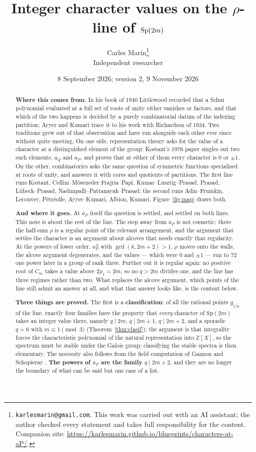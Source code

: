 \documentclass[11pt,a4paper]{article}
\title{\vspace{-1.4cm}\Large Integer character values on the $\rho$-line of $\Sp(2m)$}
\author{\normalsize Carles Mar\'in\thanks{\texttt{karlesmarin@gmail.com}.
This work was carried out with an AI assistant; the author checked every statement and takes full responsibility for the content. Companion site: \url{https://karlesmarin.github.io/blueprints/characters-at-aP/}.}\\[2pt]\small Independent researcher}
\date{\normalsize 8 September 2026; version 2, 9 November 2026}
\theoremstyle{definition}
\newcommand{\Sp}{\mathrm{Sp}}
\newcommand{\ZZ}{\mathbb{Z}}
\begin{document}
\maketitle
\thispagestyle{empty}

\begin{abstract}
\noindent \textbf{Where this comes from.} In his book of 1940 Littlewood recorded that a Schur polynomial
evaluated at a full set of roots of unity either vanishes or factors, and that which of the two
happens is decided by a purely combinatorial datum of the indexing partition; Ayyer and Kumari
\cite[\S1]{AK25} trace it to his work with Richardson of 1934. Two traditions grew
out of that observation and have run alongside each other ever since without quite meeting. On one
side, representation theory asks for the value of a character at a distinguished element of the
group: Kostant's 1976 paper singles out two such elements, $a_Q$ and $a_P$, and proves that at
either of them every character is $0$ or $\pm1$. On the other, combinatorics asks the same question
of symmetric functions specialised at roots of unity, and answers it with cores and quotients of
partitions. The first line runs Kostant, Cellini--M\"oseneder Frajria--Papi,
Kumar--Lusztig--Prasad, Prasad, L\"ubeck--Prasad, Nadimpalli--Pattanayak--Prasad; the second runs
Adin--Frumkin, Lecouvey, P\'etr\'eolle, Ayyer--Kumari, Albion, Kumari. Figure~\ref{fig:map} draws
both.

\smallskip
\noindent \textbf{And where it goes.} At $a_P$ itself the question is settled, and settled on
both lines. This note is about the rest of the line. The step away from $a_P$ is not cosmetic:
there the half-sum $\rho$ is a regular point of the relevant arrangement, and the argument that
settles the character is an argument about alcoves that needs exactly that regularity. At the
powers of lower order, $a_P^{\,k}$ with $\gcd(k,2m+2)>1$, $\rho$ moves onto the walls, the alcove argument degenerates, and the values --- which
were $0$ and $\pm1$ --- run to $72$ one power later in a group of rank three. Further out it is
regular again: no positive root of $C_m$ takes a value above $2\rho_1=2m$, so no $q>2m$ divides
one, and the line has three regimes rather than two. What replaces the
alcove argument, which points of the line still admit an answer at all, and what that answer
looks like, is the content below.

\smallskip
\noindent \textbf{Three things are proved.} The first is a \textbf{classification}: of all the
rational points $g_{1/q}$ of the line, exactly four families have the property that \emph{every}
character of $\Sp(2m)$ takes an integer value there, namely $q\mid 2m$, $q\mid 2m+1$, $q\mid2m+2$,
and a sporadic $q=6$ with $m\equiv1\pmod3$ (Theorem~\ref{thm:clasif}); the argument is that integrality forces the
characteristic polynomial of the natural representation into $\ZZ[X]$, so the spectrum must be
stable under the Galois group; classifying the stable spectra is then elementary. The necessity also follows from the field computation of Gannon and Schopieray \cite{GS19}. \textbf{The powers of $a_P$ are
the family $q\mid 2m+2$}, and they are no longer the boundary of what can be said but one case of a
list.


\end{abstract}
\end{document}
